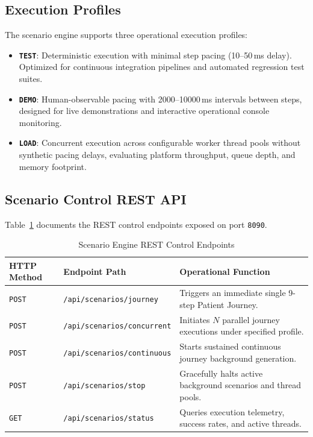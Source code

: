 \subsection{Execution Profiles}

The scenario engine supports three operational execution profiles:
\begin{itemize}
    \item \textbf{\texttt{TEST}}: Deterministic execution with minimal step pacing (10--50\,ms delay). Optimized for continuous integration pipelines and automated regression test suites.
    \item \textbf{\texttt{DEMO}}: Human-observable pacing with 2000--10000\,ms intervals between steps, designed for live demonstrations and interactive operational console monitoring.
    \item \textbf{\texttt{LOAD}}: Concurrent execution across configurable worker thread pools without synthetic pacing delays, evaluating platform throughput, queue depth, and memory footprint.
\end{itemize}

\subsection{Scenario Control REST API}

Table~\ref{tab:scenario_api} documents the REST control endpoints exposed on port \texttt{8090}.

\begin{table}[htbp]
\centering
\small
\begin{tabularx}{\textwidth}{l l p{6.5cm}}
\toprule
\textbf{HTTP Method} & \textbf{Endpoint Path} & \textbf{Operational Function} \\
\midrule
\texttt{POST} & \texttt{/api/scenarios/journey} & Triggers an immediate single 9-step Patient Journey. \\
\texttt{POST} & \texttt{/api/scenarios/concurrent} & Initiates $N$ parallel journey executions under specified profile. \\
\texttt{POST} & \texttt{/api/scenarios/continuous} & Starts sustained continuous journey background generation. \\
\texttt{POST} & \texttt{/api/scenarios/stop} & Gracefully halts active background scenarios and thread pools. \\
\texttt{GET}  & \texttt{/api/scenarios/status} & Queries execution telemetry, success rates, and active threads. \\
\bottomrule
\end{tabularx}
\caption{Scenario Engine REST Control Endpoints}
\label{tab:scenario_api}
\end{table}

